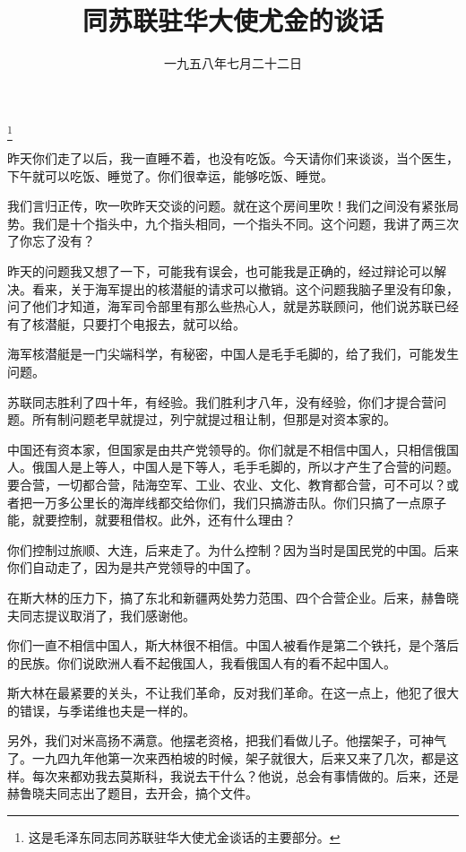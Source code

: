 
\title{同苏联驻华大使尤金的谈话}
\date{一九五八年七月二十二日}
\thanks{这是毛泽东同志同苏联驻华大使尤金谈话的主要部分。}
\maketitle


昨天你们走了以后，我一直睡不着，也没有吃饭。今天请你们来谈谈，当个医生，下午就可以吃饭、睡觉了。你们很幸运，能够吃饭、睡觉。

我们言归正传，吹一吹昨天交谈的问题。就在这个房间里吹！我们之间没有紧张局势。我们是十个指头中，九个指头相同，一个指头不同。这个问题，我讲了两三次了你忘了没有？

昨天的问题我又想了一下，可能我有误会，也可能我是正确的，经过辩论可以解决。看来，关于海军提出的核潜艇的请求可以撤销。这个问题我脑子里没有印象，问了他们才知道，海军司令部里有那么些热心人，就是苏联顾问，他们说苏联已经有了核潜艇，只要打个电报去，就可以给。

海军核潜艇是一门尖端科学，有秘密，中国人是毛手毛脚的，给了我们，可能发生问题。

苏联同志胜利了四十年，有经验。我们胜利才八年，没有经验，你们才提合营问题。所有制问题老早就提过，列宁就提过租让制，但那是对资本家的。

中国还有资本家，但国家是由共产党领导的。你们就是不相信中国人，只相信俄国人。俄国人是上等人，中国人是下等人，毛手毛脚的，所以才产生了合营的问题。要合营，一切都合营，陆海空军、工业、农业、文化、教育都合营，可不可以？或者把一万多公里长的海岸线都交给你们，我们只搞游击队。你们只搞了一点原子能，就要控制，就要租借权。此外，还有什么理由？

你们控制过旅顺、大连，后来走了。为什么控制？因为当时是国民党的中国。后来你们自动走了，因为是共产党领导的中国了。

在斯大林的压力下，搞了东北和新疆两处势力范围、四个合营企业。后来，赫鲁晓夫同志提议取消了，我们感谢他。

你们一直不相信中国人，斯大林很不相信。中国人被看作是第二个铁托，是个落后的民族。你们说欧洲人看不起俄国人，我看俄国人有的看不起中国人。

斯大林在最紧要的关头，不让我们革命，反对我们革命。在这一点上，他犯了很大的错误，与季诺维也夫是一样的。

另外，我们对米高扬不满意。他摆老资格，把我们看做儿子。他摆架子，可神气了。一九四九年他第一次来西柏坡的时候，架子就很大，后来又来了几次，都是这样。每次来都劝我去莫斯科，我说去干什么？他说，总会有事情做的。后来，还是赫鲁晓夫同志出了题目，去开会，搞个文件。

